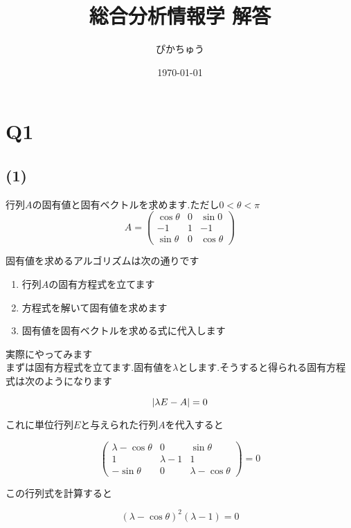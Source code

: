 \documentclass{article}
\title{総合分析情報学 解答}
\author{ぴかちゅう}
\date{\today}
\begin{document}
\maketitle

\section*{Q1}
\subsection*{(1)}
行列\(A\)の固有値と固有ベクトルを求めます.ただし\(0 < \theta < \pi\)
\[
    A = \begin{pmatrix}
        \cos \theta & 0 & \sin 0      \\
        -1          & 1 & -1          \\
        \sin \theta & 0 & \cos \theta
    \end{pmatrix}
\]

固有値を求めるアルゴリズムは次の通りです\\

\begin{enumerate}
    \item 行列$A$の固有方程式を立てます
    \item 方程式を解いて固有値を求めます
    \item 固有値を固有ベクトルを求める式に代入します
\end{enumerate}

実際にやってみます\\

まずは固有方程式を立てます.固有値を$\lambda$とします.そうすると得られる固有方程式は次のようになります

$$
    |\lambda E - A| = 0\\
$$

これに単位行列$E$と与えられた行列$A$を代入すると

$$
    \left(
    \begin{array}{ccc}
            \lambda - \cos \theta & 0           & \sin \theta           \\
            1                     & \lambda - 1 & 1                     \\
            - \sin \theta         & 0           & \lambda - \cos \theta
        \end{array}
    \right) = 0
$$

この行列式を計算すると

$$
    (\lambda - \cos \theta)^2(\lambda - 1) = 0
$$
\end{document}
